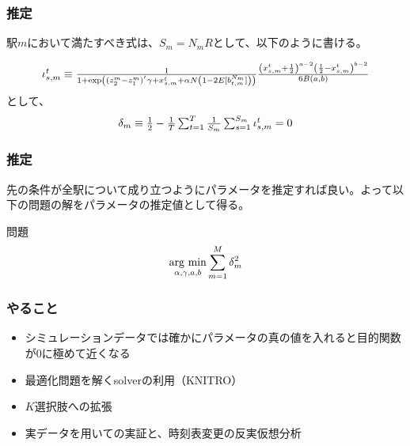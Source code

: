 \documentclass[dvipdfmx, 12pt]{beamer}
\begin{document}
\begin{frame}\frametitle{推定}
	駅$m$において満たすべき式は、$S_m = N_m R$として、以下のように書ける。
	
	\begin{align*}
	\scalebox{1}{$
	\iota_{s, m}^t \equiv \frac{1}{1 + \exp\left( (z_2^m - z_1^m)^{'}\gamma + x_{s,m}^t + \alpha N \left(1 - 2E[b_{t,m}^{N_m}]\right) \right)} \frac{\left(x_{s,m}^t + \frac{1}{2}\right)^{a - 2} \left(\frac{1}{2} - x_{s,m}^t \right)^{b-2}}{6B(a, b)} $}
	\end{align*}
	として、
	\begin{align*}
	\scalebox{1}{$
	\delta_m \equiv \frac{1}{2} - \frac{1}{T}\sum_{t = 1}^T \frac{1}{S_m}\sum_{s = 1}^{S_m} \iota_{s, m}^t = 0 $}
	\end{align*}
\end{frame}

\begin{frame}\frametitle{推定}
	先の条件が全駅について成り立つようにパラメータを推定すれば良い。よって以下の問題の解をパラメータの推定値として得る。
	
	\begin{itembox}[l]{問題}
	\begin{align*}
		\mathop{\rm arg~min}\limits_{\alpha, \gamma, a, b} \sum_{m = 1}^M \delta_m^2
	\end{align*}
	\end{itembox}
\end{frame}

\begin{frame}\frametitle{やること}
	\begin{itemize}
		\item シミュレーションデータでは確かにパラメータの真の値を入れると目的関数が0に極めて近くなる
		\item 最適化問題を解くsolverの利用（KNITRO）
		\item $K$選択肢への拡張
		\item 実データを用いての実証と、時刻表変更の反実仮想分析
	\end{itemize}
\end{frame}
\end{document}
